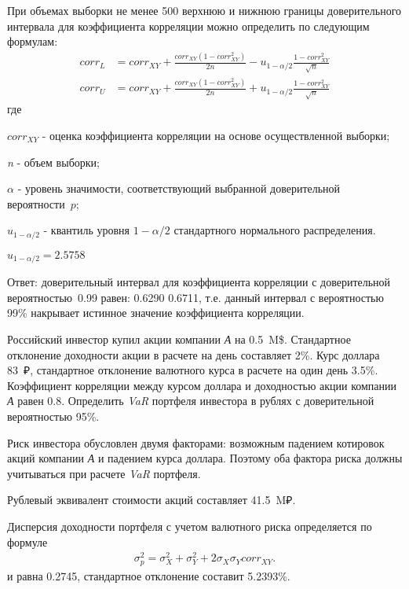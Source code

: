 \documentclass[12pt, table, twoside, a4paper]{exam}
\begin{document}
\begin{questions}
\begin{solution}[6em]
	
	\raggedright
	При объемах выборки не менее 500 верхнюю и нижнюю границы доверительного интервала для коэффициента корреляции можно определить по следующим формулам:
	\begin{align}
	corr_L&=corr_{XY}+\frac{corr_{XY}(1-corr_{XY}^2)}{2n}-u_{1-\alpha/2}\frac{1-corr_{XY}^2}{\sqrt{n}}\\
	corr_U&=corr_{XY}+\frac{corr_{XY}(1-corr_{XY}^2)}{2n}+u_{1-\alpha/2}\frac{1-corr_{XY}^2}{\sqrt{n}}
	\end{align}
	где
	
	$corr_{XY}$ - оценка коэффициента корреляции на основе осуществленной выборки;
	
	\textit{n} - объем выборки;
	
	$\alpha$ - уровень значимости, соответствующий выбранной доверительной вероятности~$p$;
	
	$u_{1-\alpha/2}$ - квантиль уровня $1-\alpha/2$ стандартного нормального распределения.
	
	$u_{1-\alpha/2}=2.5758$	
		
	Ответ: доверительный интервал для коэффициента корреляции с доверительной вероятностью~0.99 равен: 0.6290 0.6711, т.е. данный интервал с вероятностью 99\% накрывает истинное значение коэффициента корреляции.	
\end{solution}

\question[10] Российский инвестор купил акции компании \textit{А} на 0.5~M\$. Стандартное отклонение доходности акции в расчете на день составляет 2\%. Курс доллара 83~₽, стандартное отклонение валютного курса в расчете на один день 3.5\%. Коэффициент корреляции между курсом доллара и доходностью акции компании \textit{А} равен 0.8. Определить \textit{VaR }портфеля инвестора в рублях с доверительной вероятностью 95\%.

\begin{solution}[6em]
	
	\raggedright
	Риск инвестора обусловлен двумя факторами: возможным падением котировок акций компании \textit{А} и падением курса доллара. Поэтому оба фактора риска должны учитываться при расчете \textit{VaR }портфеля.
	
	Рублевый эквивалент стоимости акций составляет 41.5~M₽.
	
	Дисперсия доходности портфеля с учетом валютного риска определяется по формуле 
	\begin{align}
	\sigma_p^2=\sigma_X^2+\sigma_Y^2+2\sigma_X\sigma_Y corr_{XY}.
	\end{align}
	и равна 0.2745, стандартное отклонение составит 5.2393\%.
	

\end{solution}
\end{questions}
\end{document}
